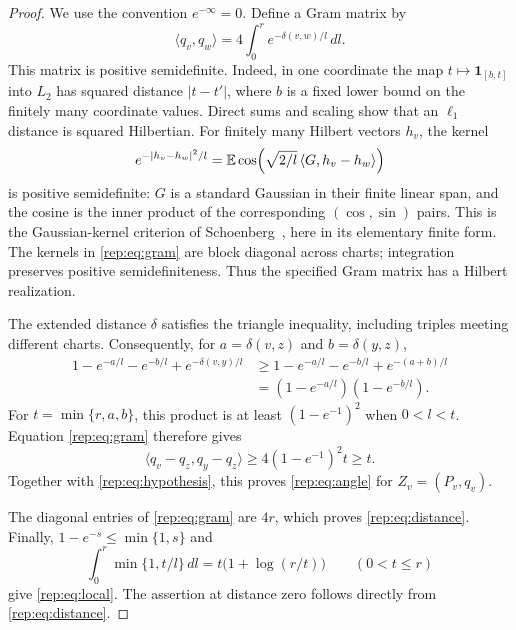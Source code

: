 \begin{proof}
We use the convention $e^{-\infty}=0$. Define a Gram matrix by
\begin{equation}\label{rep:eq:gram}
\langle q_v,q_w\rangle=4\int_0^r e^{-\delta(v,w)/l}\,dl.
\end{equation}
This matrix is positive semidefinite. Indeed, in one coordinate the
map $t\mapsto\mathbf1_{[b,t]}$ into $L_2$ has squared distance
$|t-t'|$, where $b$ is a fixed lower bound on the finitely many
coordinate values. Direct sums and scaling show that an $\ell_1$
distance is squared Hilbertian. For finitely many Hilbert vectors
$h_v$, the kernel
\[
e^{-|h_v-h_w|^2/l}
=\mathbb E\cos\!\left(\sqrt{2/l}\,\langle G,h_v-h_w\rangle\right)
\]
is positive semidefinite: $G$ is a standard Gaussian in their finite
linear span, and the cosine is the inner product of the corresponding
$(\cos,\sin)$ pairs. This is the Gaussian-kernel criterion of
Schoenberg~\cite{Sch38}, here in its elementary finite form.
The kernels in \eqref{rep:eq:gram} are block diagonal across charts;
integration preserves positive semidefiniteness. Thus the specified
Gram matrix has a Hilbert realization.

The extended distance $\delta$ satisfies the triangle inequality,
including triples meeting different charts. Consequently, for
$a=\delta(v,z)$ and $b=\delta(y,z)$,
\[
\begin{split}
1-e^{-a/l}-e^{-b/l}+e^{-\delta(v,y)/l}
&\ge 1-e^{-a/l}-e^{-b/l}+e^{-(a+b)/l}\\
&=(1-e^{-a/l})(1-e^{-b/l}).
\end{split}
\]
For $t=\min\{r,a,b\}$, this product is at least $(1-e^{-1})^2$
when $0<l<t$. Equation \eqref{rep:eq:gram} therefore gives
\[
\langle q_v-q_z,q_y-q_z\rangle
\ge4(1-e^{-1})^2t\ge t.
\]
Together with \eqref{rep:eq:hypothesis}, this proves
\eqref{rep:eq:angle} for $Z_v=(P_v,q_v)$.

The diagonal entries of \eqref{rep:eq:gram} are $4r$, which proves
\eqref{rep:eq:distance}. Finally, $1-e^{-s}\le\min\{1,s\}$ and
\[
\int_0^r\min\{1,t/l\}\,dl=t\bigl(1+\log(r/t)\bigr)
\qquad(0<t\le r)
\]
give \eqref{rep:eq:local}. The assertion at distance zero follows
directly from \eqref{rep:eq:distance}.
\end{proof}
